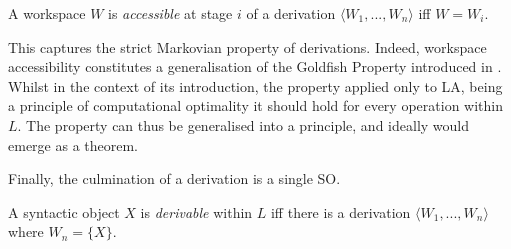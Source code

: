 \begin{definition}\label{def:WspaceAccess}
    A workspace $W$ is \textit{accessible} at stage $i$ of a derivation $\langle W_1, ..., W_n \rangle$ iff $W = W_i$.
\end{definition}
\noindent
This captures the strict Markovian property of derivations. Indeed, workspace accessibility constitutes a generalisation of the Goldfish Property introduced in . Whilst in the context of its introduction, the property applied only to LA, being a principle of computational optimality it should hold for every operation within $L$. The property can thus be generalised into a principle, and ideally would emerge as a theorem.

Finally, the culmination of a derivation is a single SO.

\begin{definition}
    A syntactic object $X$ is \textit{derivable} within $L$ iff there is a derivation $\langle W_1, ..., W_n \rangle$ where $W_n = \{X\}$.
\end{definition}

